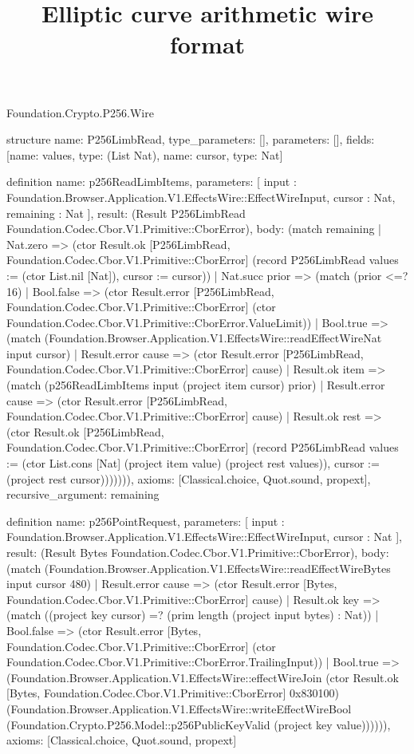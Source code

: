 \begin{lexlean}{Foundation.Crypto.P256.Wire}
\title{Elliptic curve arithmetic wire format}
\begin{semanticmodule}
structure{
  name: P256LimbRead,
  type_parameters: [],
  parameters: [],
  fields: [{name: values, type: (List Nat)}, {name: cursor, type: Nat}]
}

definition{
  name: p256ReadLimbItems,
  parameters: [
    input : Foundation.Browser.Application.V1.EffectsWire::EffectWireInput,
    cursor : Nat,
    remaining : Nat
  ],
  result: (Result P256LimbRead Foundation.Codec.Cbor.V1.Primitive::CborError),
  body: (match remaining
    | Nat.zero => (ctor Result.ok [P256LimbRead, Foundation.Codec.Cbor.V1.Primitive::CborError] (record P256LimbRead {values := (ctor List.nil [Nat]), cursor := cursor}))
    | Nat.succ prior => (match (prior <=? 16)
      | Bool.false => (ctor Result.error [P256LimbRead, Foundation.Codec.Cbor.V1.Primitive::CborError] (ctor Foundation.Codec.Cbor.V1.Primitive::CborError.ValueLimit))
      | Bool.true => (match (Foundation.Browser.Application.V1.EffectsWire::readEffectWireNat input cursor)
        | Result.error cause => (ctor Result.error [P256LimbRead, Foundation.Codec.Cbor.V1.Primitive::CborError] cause)
        | Result.ok item => (match (p256ReadLimbItems input (project item cursor) prior)
          | Result.error cause => (ctor Result.error [P256LimbRead, Foundation.Codec.Cbor.V1.Primitive::CborError] cause)
          | Result.ok rest => (ctor Result.ok [P256LimbRead, Foundation.Codec.Cbor.V1.Primitive::CborError] (record P256LimbRead {values := (ctor List.cons [Nat] (project item value) (project rest values)), cursor := (project rest cursor)})))))),
  axioms: [Classical.choice, Quot.sound, propext],
  recursive_argument: remaining
}

definition{
  name: p256PointRequest,
  parameters: [
    input : Foundation.Browser.Application.V1.EffectsWire::EffectWireInput,
    cursor : Nat
  ],
  result: (Result Bytes Foundation.Codec.Cbor.V1.Primitive::CborError),
  body: (match (Foundation.Browser.Application.V1.EffectsWire::readEffectWireBytes input cursor 480)
    | Result.error cause => (ctor Result.error [Bytes, Foundation.Codec.Cbor.V1.Primitive::CborError] cause)
    | Result.ok key => (match ((project key cursor) =? (prim length (project input bytes) : Nat))
      | Bool.false => (ctor Result.error [Bytes, Foundation.Codec.Cbor.V1.Primitive::CborError] (ctor Foundation.Codec.Cbor.V1.Primitive::CborError.TrailingInput))
      | Bool.true => (Foundation.Browser.Application.V1.EffectsWire::effectWireJoin (ctor Result.ok [Bytes, Foundation.Codec.Cbor.V1.Primitive::CborError] 0x830100) (Foundation.Browser.Application.V1.EffectsWire::writeEffectWireBool (Foundation.Crypto.P256.Model::p256PublicKeyValid (project key value)))))),
  axioms: [Classical.choice, Quot.sound, propext]
}


\end{semanticmodule}
\end{lexlean}
